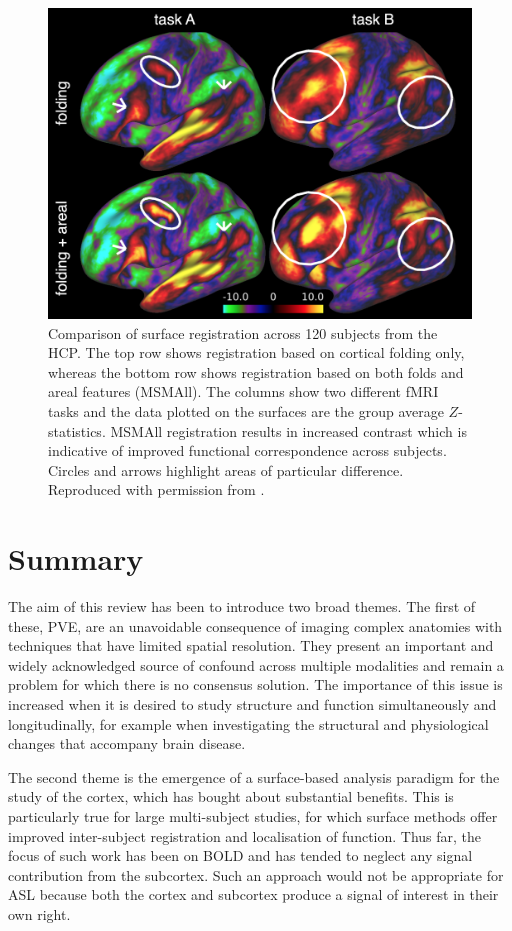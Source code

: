 \documentclass[12pt]{report}
\begin{document}
\begin{figure}[H]
\centering
\includegraphics[width = \textwidth]{msmall_demo.png}
\caption{Comparison of surface registration across 120 subjects from the HCP. The top row shows registration based on cortical folding only, whereas the bottom row shows registration based on both folds and areal features (MSMAll). The columns show two different fMRI tasks and the data plotted on the surfaces are the group average $Z$-statistics. MSMAll registration results in increased contrast which is indicative of improved functional correspondence across subjects. Circles and arrows highlight areas of particular difference. Reproduced with permission from \cite{Glasser2016a}.}
\label{msmall_demo}
\end{figure}


\section{Summary}

The aim of this review has been to introduce two broad themes. The first of these, PVE, are an unavoidable consequence of imaging complex anatomies with techniques that have limited spatial resolution. They present an important and widely acknowledged source of confound across multiple modalities and remain a problem for which there is no consensus solution. The importance of this issue is increased when it is desired to study structure and function simultaneously and longitudinally, for example when investigating the structural and physiological changes that accompany brain disease. 

The second theme is the emergence of a surface-based analysis paradigm for the study of the cortex, which has bought about substantial benefits. This is particularly true for large multi-subject studies, for which surface methods offer improved inter-subject registration and localisation of function. Thus far, the focus of such work has been on BOLD and has tended to neglect any signal contribution from the subcortex. Such an approach would not be appropriate for ASL because both the cortex and subcortex produce a signal of interest in their own right. 
\end{document}
